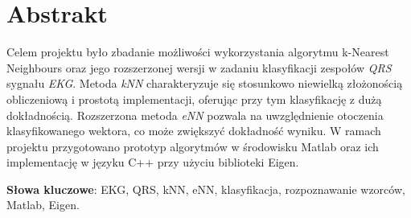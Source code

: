 \section*{Abstrakt}

Celem projektu było zbadanie możliwości wykorzystania algorytmu k-Nearest Neighbours oraz jego rozszerzonej wersji w zadaniu klasyfikacji zespołów \textit{QRS} sygnału \textit{EKG}. Metoda \textit{kNN} charakteryzuje się stosunkowo niewielką złożonością obliczeniową i prostotą implementacji, oferując przy tym klasyfikację z dużą dokładnością. Rozszerzona metoda \textit{eNN} pozwala na uwzględnienie otoczenia klasyfikowanego wektora, co może zwiększyć dokładność wyniku. W ramach projektu przygotowano prototyp algorytmów w środowisku Matlab oraz ich implementację w języku C++ przy użyciu biblioteki Eigen.


\textbf{Słowa kluczowe}:
EKG, QRS, kNN, eNN, klasyfikacja, rozpoznawanie wzorców, Matlab, Eigen.